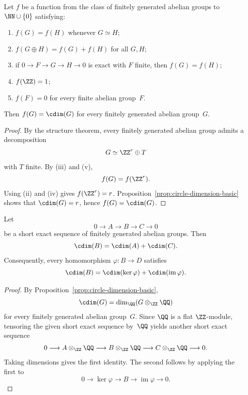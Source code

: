 \begin{theorem}%
\label{thm:cdim-axiomatic-rigidity}
Let $f$ be a function from the class of finitely generated abelian groups
to $\NN\cup\{0\}$ satisfying:
\begin{enumerate}[label=(\roman*)]
\item $f(G)=f(H)$ whenever $G\simeq H$;
\item $f(G\oplus H)=f(G)+f(H)$ for all $G,H$;
\item if
      $0\to F\to G\to H\to 0$
      is exact with $F$ finite, then $f(G)=f(H)$;
\item $f(\ZZ)=1$;
\item $f(F)=0$ for every finite abelian group~$F$.
\end{enumerate}
Then $f(G)=\cdim(G)$ for every finitely generated abelian group~$G$.
\end{theorem}

\begin{proof}
By the structure theorem, every finitely generated abelian group admits a
decomposition
\[
G\simeq \ZZ^r\oplus T
\]
with $T$ finite.  By (iii) and (v),
\[
f(G)=f(\ZZ^r).
\]
Using (ii) and (iv) gives $f(\ZZ^r)=r$.  Proposition~\ref{prop:circle-dimension-basic}
shows that $\cdim(G)=r$, hence $f(G)=\cdim(G)$.
\end{proof}

\begin{theorem}%
\label{thm:cdim-short-exact-additivity}
Let
\[
0\longrightarrow A\longrightarrow B\longrightarrow C\longrightarrow 0
\]
be a short exact sequence of finitely generated abelian groups.  Then
\[
\cdim(B)=\cdim(A)+\cdim(C).
\]
Consequently, every homomorphism $\varphi:B\to D$ satisfies
\[
\cdim(B)=\cdim(\ker\varphi)+\cdim(\operatorname{im}\varphi).
\]
\end{theorem}

\begin{proof}
By Proposition~\ref{prop:circle-dimension-basic},
\[
\cdim(G)=\dim_{\QQ}(G\otimes_{\ZZ}\QQ)
\]
for every finitely generated abelian group~$G$.  Since $\QQ$ is a flat
$\ZZ$-module, tensoring the given short exact sequence by~$\QQ$ yields
another short exact sequence
\[
0\longrightarrow A\otimes_{\ZZ}\QQ
\longrightarrow B\otimes_{\ZZ}\QQ
\longrightarrow C\otimes_{\ZZ}\QQ
\longrightarrow 0.
\]
Taking dimensions gives the first identity.  The second follows by
applying the first to
\[
0\longrightarrow \ker\varphi
\longrightarrow B
\longrightarrow \operatorname{im}\varphi
\longrightarrow 0.
\]
\end{proof}

